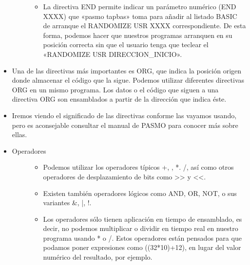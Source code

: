 \documentclass[letterpaper,10pt,spanish]{sphinxmanual}
\begin{document}
\begin{itemize}
\begin{description}
\begin{itemize}
\item {} 
La directiva END permite indicar un parámetro numérico (END XXXX) que «pasmo \textendash{}tapbas» toma para añadir al listado BASIC de arranque el RANDOMIZE USR XXXX correspondiente. De esta forma, podemos hacer que nuestros programas arranquen en su posición correcta sin que el usuario tenga que teclear el «RANDOMIZE USR DIRECCION\_INICIO».

\end{itemize}

\end{description}

\item {} 
Una de las directivas más importantes es ORG, que indica la posición origen donde almacenar el código que la sigue. Podemos utilizar diferentes directivas ORG en un mismo programa. Los datos o el código que siguen a una directiva ORG son ensamblados a partir de la dirección que indica éste.

\item {} 
Iremos viendo el significado de las directivas conforme las vayamos usando, pero es aconsejable consultar el manual de PASMO para conocer más sobre ellas.

\item {} \begin{description}
\item[{Operadores}] \leavevmode\begin{itemize}
\item {} 
Podemos utilizar los operadores típicos +, \sphinxhyphen{}, *. /, así como otros operadores de desplazamiento de bits como \textgreater{}\textgreater{} y \textless{}\textless{}.

\item {} 
Existen también operadores lógicos como AND, OR, NOT, o sus variantes \&, |, !.

\item {} 
Los operadores sólo tienen aplicación en tiempo de ensamblado, es decir, no podemos multiplicar o dividir en tiempo real en nuestro programa usando * o /. Estos operadores están pensados para que podamos poner expresiones como ((32*10)+12), en lugar del valor numérico del resultado, por ejemplo.

\end{itemize}

\end{description}

\end{itemize}
\end{document}
